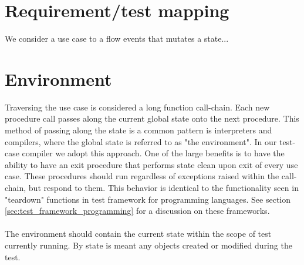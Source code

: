 \section{Requirement/test mapping}

We consider a use case to a flow events that mutates a state...


\section{Environment}
Traversing the use case is considered a long function call-chain. Each new procedure call passes along the current global state onto the next procedure. This method of passing along the state is a common pattern is interpreters and compilers, where the global state is referred to as "the environment". In our test-case compiler we adopt this approach. One of the large benefits is to have the ability to have an exit procedure that performs state clean upon exit of every use case. These procedures should run regardless of exceptions raised within the call-chain, but respond to them. This behavior is identical to the functionality seen in "teardown" functions in test framework for programming languages. See section \ref{sec:test_framework_programming} for a discussion on these frameworks.\\\\
The environment should contain the current state within the scope of test currently running. By state is meant any objects created or modified during the test.
